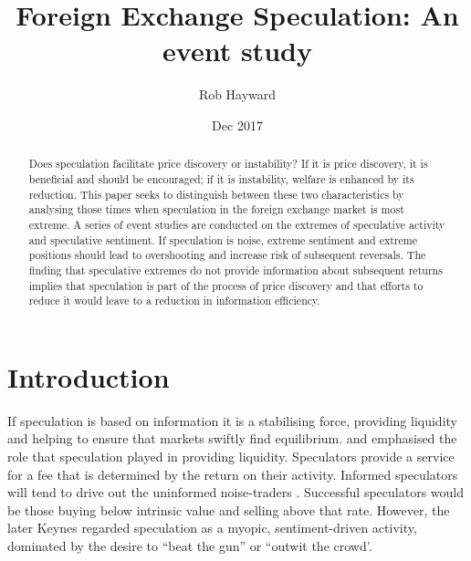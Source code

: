 \documentclass{article}
\title{Foreign Exchange Speculation: An event study}
\author{Rob Hayward}
\date{Dec 2017}
\begin{document}
\maketitle
\begin{abstract}
Does speculation facilitate price discovery or instability?  If it is price discovery, it is beneficial and should be encouraged; if it is instability, welfare is enhanced by its reduction. This paper seeks to distinguish between these two characteristics by analysing those times when speculation in the foreign exchange market is most extreme.  A series of event studies are conducted on the extremes of speculative activity and speculative sentiment. If speculation is noise,  extreme sentiment and extreme positions should lead to overshooting and increase risk of subsequent reversals. The finding that speculative extremes do not provide information about subsequent returns implies that speculation is part of the process of price discovery and that efforts to reduce it would leave to a reduction in information efficiency. 

\end{abstract}

\section{Introduction}
If speculation is based on information it is a stabilising force, providing liquidity and helping to ensure that markets swiftly find equilibrium. \citet{KeynesHedge} and \citet{HicksHedge} emphasised the role that speculation played in providing liquidity. Speculators provide a service for a fee that is determined by the return on their activity.  Informed speculators will tend to drive out the uninformed noise-traders \citet{FriedmanPositive}.  Successful speculators would be those buying below intrinsic value and selling above that rate.  However, the later Keynes regarded speculation as a myopic, sentiment-driven activity, dominated by the desire to ``beat the gun'' or  ``outwit the crowd'\citet[p. 101]{Keynes1936}.  
\end{document}
